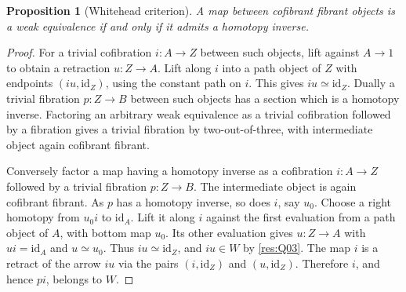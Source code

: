 \documentclass[11pt,oneside,openany]{book}
\newtheorem{proposition}[theorem]{Proposition}
\theoremstyle{definition}
\theoremstyle{remark}
\begin{document}
\begin{proposition}[Whitehead criterion]\label{res:Q04}
A map between cofibrant fibrant objects is a weak equivalence
if and only if it admits a homotopy inverse.
\end{proposition}
\begin{proof}
For a trivial cofibration \(i:A\to Z\) between such objects,
lift against \(A\to1\) to obtain a retraction \(u:Z\to A\).
Lift along \(i\) into a path object of \(Z\) with endpoints
\((iu,\mathrm{id}_Z)\), using the constant path on \(i\).
This gives \(iu\simeq\mathrm{id}_Z\). Dually a trivial
fibration \(p:Z\to B\) between such objects has a section
which is a homotopy inverse. Factoring an arbitrary weak
equivalence as a trivial cofibration followed by a fibration
gives a trivial fibration by two-out-of-three, with
intermediate object again cofibrant fibrant.

Conversely factor a map having a homotopy inverse as a
cofibration \(i:A\to Z\) followed by a trivial
fibration \(p:Z\to B\). The intermediate object is again
cofibrant fibrant. As \(p\) has a homotopy inverse, so does
\(i\), say \(u_0\). Choose a right homotopy from
\(u_0 i\) to \(\mathrm{id}_A\). Lift it along \(i\) against
the first evaluation from a path object of \(A\), with
bottom map \(u_0\). Its other evaluation gives
\(u:Z\to A\) with \(ui=\mathrm{id}_A\) and \(u\simeq u_0\).
Thus \(iu\simeq\mathrm{id}_Z\), and \(iu\in W\) by
\ref{res:Q03}. The map \(i\) is a retract of the arrow \(iu\)
via the pairs \((i,\mathrm{id}_Z)\) and
\((u,\mathrm{id}_Z)\). Therefore \(i\), and hence \(pi\),
belongs to \(W\).
\end{proof}
\end{document}

